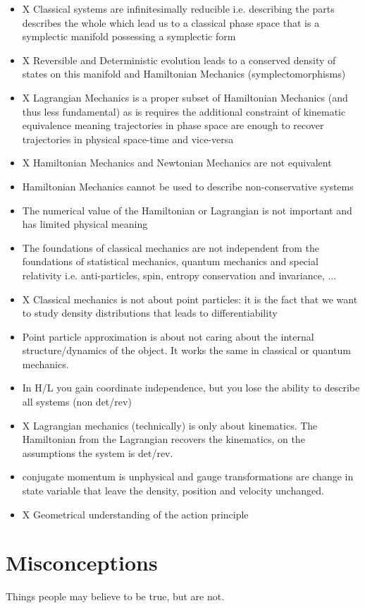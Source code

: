 \documentclass{article}
\begin{document}
\begin{itemize}
	\item  X Classical systems are infinitesimally reducible i.e. describing the parts describes the whole which lead us to a classical phase space that is a symplectic manifold possessing a symplectic form
	\item X Reversible and Deterministic evolution leads to a conserved density of states on this manifold and Hamiltonian Mechanics (symplectomorphisms) 
	\item X Lagrangian Mechanics is a proper subset of Hamiltonian Mechanics (and thus less fundamental) as is requires the additional constraint of kinematic equivalence meaning trajectories in phase space are enough to recover trajectories in physical space-time and vice-versa
	\item X Hamiltonian Mechanics and Newtonian Mechanics are not equivalent
	\item Hamiltonian Mechanics cannot be used to describe non-conservative systems
	\item The numerical value of the Hamiltonian or Lagrangian is not important and has limited physical meaning
	\item The foundations of classical mechanics are not independent from the foundations of statistical mechanics, quantum mechanics and special relativity i.e. anti-particles, spin, entropy conservation and invariance, ...
	\item X Classical mechanics is not about point particles: it is the fact that we want to study density distributions that leads to differentiability
	\item Point particle approximation is about not caring about the internal structure/dynamics of the object. It works the same in classical or quantum mechanics.
	\item In H/L you gain coordinate independence, but you lose the ability to describe all systems (non det/rev)
	\item X Lagrangian mechanics (technically) is only about kinematics. The Hamiltonian from the Lagrangian recovers the kinematics, on the assumptions the system is det/rev.
	\item conjugate momentum is unphysical and gauge transformations are change in state variable that leave the density, position and velocity unchanged.
	\item X Geometrical understanding of the action principle
\end{itemize}


\section{Misconceptions}
Things people may believe to be true, but are not.
\end{document}
